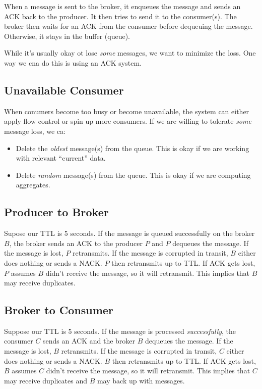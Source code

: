 \documentclass{report}
\renewcommand{\it}[1]{\textit{{#1}}}
\begin{document}
When a message is sent to the broker, it enqueues the message and sends an ACK
back to the producer. It then tries to send it to the consumer(s). The broker
then waits for an ACK from the consumer before dequeuing the message. Otherwise,
it stays in the buffer (queue).

While it's usually okay ot lose \it{some} messages, we want to minimize the
loss. One way we cna do this is using an ACK system.

\subsection{Unavailable Consumer}
When conumers become too busy or become unavailable, the system can either apply
flow control or spin up more consumers. If we are willing to tolerate \it{some}
message loss, we ca:
\begin{itemize}[label=$\to$]
    \item Delete the \it{oldest} message(s) from the queue. This is okay if we
        are working with relevant ``current'' data.
    \item Delete \it{random} message(s) from the queue. This is okay if we are
        computing aggregates.
\end{itemize}

\subsection{Producer to Broker}
Supose our TTL is 5 seconds. If the message is queued successfully on the
broker $B$, the broker sends an ACK to the producer $P$ and $P$ dequeues the
message. If the message is lost, $P$ retransmits. If the message is corrupted in
transit, $B$ either does nothing or sends a NACK. $P$ then retransmits up to
TTL. If ACK gets lost, $P$ assumes $B$ didn't receive the message, so it will
retransmit. This implies that $B$ may receive duplicates.

\subsection{Broker to Consumer}
Suppose our TTL is 5 seconds. If the message is processed \it{successfully}, the
consumer $C$ sends an ACK and the broker $B$ dequeues the message. If the
message is lost, $B$ retransmits. If the message is corrupted in transit, $C$
either does nothing or sends a NACK. $B$ then retransmits up to TTL. If ACK gets
lost, $B$ assumes $C$ didn't receive the message, so it will retransmit. This
implies that $C$ may receive duplicates and $B$ may back up with messages.
\end{document}
